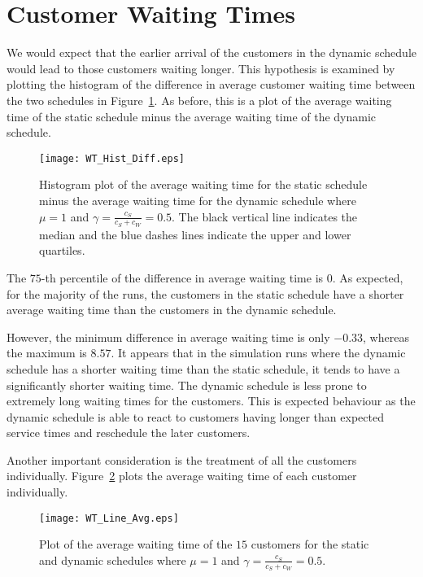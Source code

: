 \section{Customer Waiting Times}
We would expect that the earlier arrival of the customers in the dynamic schedule would lead to those customers waiting longer. This hypothesis is examined by plotting the histogram of the difference in average customer waiting time between the two schedules in Figure~\ref{fig:Diff_Wait}. As before, this is a plot of the average waiting time of the static schedule minus the average waiting time of the dynamic schedule.
\begin{figure}[htb]
	\centering
	\texttt{[image: WT\_Hist\_Diff.eps]}
	\caption{Histogram plot of the average waiting time for the static schedule minus the average waiting time for the dynamic schedule where $\mu = 1$ and $\gamma = \frac{c_{S}}{c_{S} + c_{W}} = 0.5$. The black vertical line indicates the median and the blue dashes lines indicate the upper and lower quartiles.}
	\label{fig:Diff_Wait}
\end{figure}

The $75$-th percentile of the difference in average waiting time is $0$. As expected, for the majority of the runs, the customers in the static schedule have a shorter average waiting time than the customers in the dynamic schedule.

However, the minimum difference in average waiting time is only $-0.33$, whereas the maximum is $8.57$. It appears that in the simulation runs where the dynamic schedule has a shorter waiting time than the static schedule, it tends to have a significantly shorter waiting time. The dynamic schedule is less prone to extremely long waiting times for the customers. This is expected behaviour as the dynamic schedule is able to react to customers having longer than expected service times and reschedule the later customers.

Another important consideration is the treatment of all the customers individually. Figure~\ref{fig:Avg_Wait_Position} plots the average waiting time of each customer individually.
\begin{figure}[htb]
	\centering
	\texttt{[image: WT\_Line\_Avg.eps]}
	\caption{Plot of the average waiting time of the $15$ customers for the static and dynamic schedules where $\mu = 1$ and $\gamma = \frac{c_{S}}{c_{S} + c_{W}} = 0.5$.}
	\label{fig:Avg_Wait_Position}
\end{figure}

